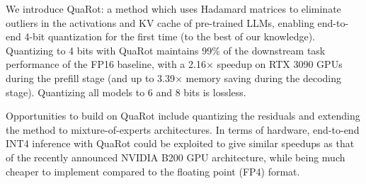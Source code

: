 We introduce QuaRot: a method which uses Hadamard matrices to eliminate outliers in the activations and KV cache of pre-trained LLMs, enabling end-to-end 4-bit quantization for the first time (to the best of our knowledge). Quantizing \llamaBig to 4 bits with QuaRot maintains 99\% of the downstream task performance of the FP16 baseline, with a 2.16$\times$ speedup on RTX 3090 GPUs during the prefill stage (and up to 3.39$\times$ memory saving during the decoding stage). Quantizing all \llama models to 6 and 8 bits is lossless. 

Opportunities to build on QuaRot include quantizing the residuals and extending the method to mixture-of-experts architectures. In terms of hardware, end-to-end INT4 inference with QuaRot could be exploited to give similar speedups as that of the recently announced NVIDIA B200 GPU architecture, while being much cheaper to implement compared to the floating point (FP4) format.
